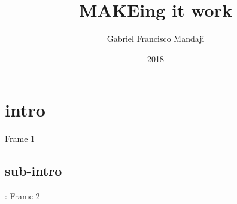 \documentclass{beamer}
\title{MAKEing it work}
\author{Gabriel Francisco Mandaji}
\institute{LKCamp}
\date{2018}
\begin{document}
\frame{\titlepage}

\section{intro}
\begin{frame}{\secname}
  Frame 1
\end{frame}

\subsection{sub-intro}
\begin{frame}{\secname : \small \subsecname \normalsize}
  Frame 2
\end{frame}
\end{document}
